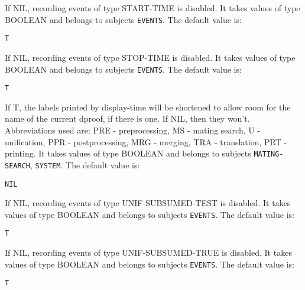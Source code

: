 \begin{description}
\item[START-TIME-ENABLED]  
If NIL, recording events of type START-TIME is disabled.
It takes values of type BOOLEAN and belongs to subjects \texttt{EVENTS}.  The default value is: \begin{lstlisting}
T
\end{lstlisting}

\item[STOP-TIME-ENABLED]  
If NIL, recording events of type STOP-TIME is disabled.
It takes values of type BOOLEAN and belongs to subjects \texttt{EVENTS}.  The default value is: \begin{lstlisting}
T
\end{lstlisting}

\item[TIMING-NAMED]  
If T, the labels printed by display-time will be shortened 
to allow room for the name of the current dproof, if there is one.
If NIL, then they won't.
Abbreviations used are: PRE - preprocessing, MS - mating search, 
U - unification, PPR - postprocessing, MRG - merging, 
TRA - translation, PRT - printing.
It takes values of type BOOLEAN and belongs to subjects \texttt{MATING-SEARCH}, \texttt{SYSTEM}.  The default value is: \begin{lstlisting}
NIL
\end{lstlisting}

\item[UNIF-SUBSUMED-TEST-ENABLED]  
If NIL, recording events of type UNIF-SUBSUMED-TEST is disabled.
It takes values of type BOOLEAN and belongs to subjects \texttt{EVENTS}.  The default value is: \begin{lstlisting}
T
\end{lstlisting}

\item[UNIF-SUBSUMED-TRUE-ENABLED]  
If NIL, recording events of type UNIF-SUBSUMED-TRUE is disabled.
It takes values of type BOOLEAN and belongs to subjects \texttt{EVENTS}.  The default value is: \begin{lstlisting}
T
\end{lstlisting}

\item
\end{description}

